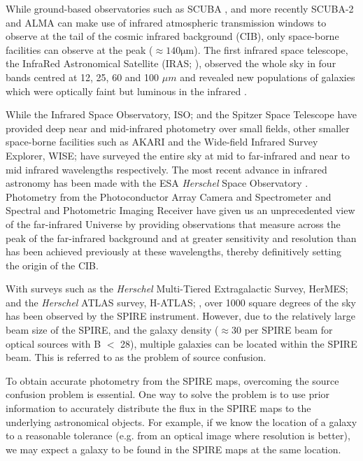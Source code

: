 \documentclass[useAMS,usenatbib]{mnras}
\begin{document}
While ground-based observatories such as SCUBA \citep{SCUBA}, and more recently SCUBA-2 \citep{SCUBA2} and ALMA can make use of infrared atmospheric transmission windows to observe at the tail of the cosmic infrared background (CIB), only space-borne facilities can observe at the peak ($\approx140\mathrm{\mu m}$). The first infrared space telescope, the InfraRed Astronomical Satellite (IRAS; \cite{Neugebauer:1984}), observed the whole sky in four bands centred at 12, 25, 60 and 100 $\mu m$ and revealed new populations of galaxies which were optically faint but luminous in the infrared \citep{Soifer:1984}.

While the Infrared Space Observatory, ISO; \cite{Kessler:1996} and the Spitzer Space Telescope \citep{Werner:2004} have provided deep near and mid-infrared photometry over small fields, other smaller space-borne facilities such as AKARI \citep{Murakami:2007} and the Wide-field Infrared Survey Explorer, WISE; \cite{Wright:2010} have surveyed the entire sky at mid to far-infrared and near to mid infrared wavelengths respectively. The most recent advance in infrared astronomy has been made with the ESA \emph{Herschel} Space Observatory \citep{Pilbratt:2010}. Photometry from the Photoconductor Array Camera and Spectrometer \citep[PACS;][]{Poglitsch:2010} and Spectral and Photometric Imaging Receiver \citep[SPIRE;][]{Griffin:2010} have given us an unprecedented view of the far-infrared Universe by providing observations that measure across the peak of the far-infrared background and at greater sensitivity and resolution than has been achieved previously at these wavelengths, thereby definitively setting the origin of the CIB.

With surveys such as the \emph{Herschel} Multi-Tiered Extragalactic Survey, HerMES; \cite{Oliver:2012} and the \emph{Herschel} ATLAS survey, H-ATLAS; \cite{Eales:2010}, over 1000 square degrees of the sky has been observed by the SPIRE instrument. However, due to the relatively large beam size of the SPIRE, and the galaxy density ($\approx 30$ per SPIRE beam for optical sources with B $<$ 28), multiple galaxies can be located within the SPIRE beam. This is referred to as the problem of source confusion.

To obtain accurate photometry from the SPIRE maps, overcoming the source confusion problem is essential. One way to solve the problem is to use prior information to accurately distribute the flux in the SPIRE maps to the underlying astronomical objects. For example, if we know the location of a galaxy to a reasonable tolerance (e.g. from an optical image where resolution is better), we may expect a galaxy to be found in the SPIRE maps at the same location.
\end{document}

